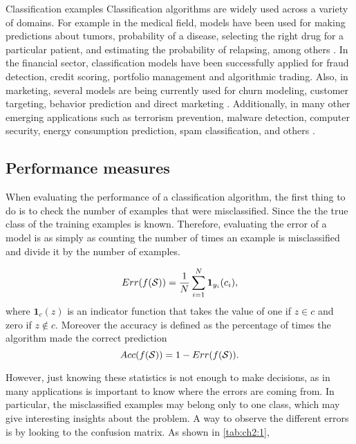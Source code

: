 \begin{remark}{Classification examples}
Classification algorithms are widely used across a variety of domains. For example in the 
medical field, models have been used for making predictions about tumors, probability 
of a disease, selecting the right drug for a particular patient, and estimating the probability of 
relapsing, among others \citep{Herland2014}. In the financial sector, classification models have 
been successfully applied for fraud detection, credit scoring, portfolio management and algorithmic 
trading. Also, in marketing, several models are being currently used for churn modeling, customer 
targeting, behavior prediction and direct marketing \citep{Baesens2014}. Additionally, in many 
other emerging applications such as terrorism prevention, malware detection, computer security, 
energy consumption prediction, spam classification, and others \citep{Kriegel2007}.
\end{remark}

\subsection{Performance measures}

When evaluating the performance of a classification algorithm, the first thing to do is to check 
the number of examples that were misclassified. Since the the true class of the training examples 
is known. Therefore, evaluating the error of a model is as simply as counting the number of times 
an example is misclassified and divide it by the number of examples.

\begin{equation}\label{eqn:ch2:error}
Err(f({\cal S})) = \frac{1}{N}  \sum_{i=1}^N {\bf 1} _{y_i}(c_i),
\end{equation}
where $\mathbf{1}_c(z)$ is an indicator function that takes the value of one if $z \in c$ and 
zero if $z \notin c$. Moreover the accuracy is defined as the percentage of times the algorithm 
made the correct prediction
\begin{equation}\label{eqn:ch2:accuracy}
Acc(f({\cal S})) = 1- Err(f({\cal S})).
\end{equation}

However, just knowing these statistics is not enough to make decisions, as in many applications is 
important to know where the errors are coming from. In particular, the misclassified examples may 
belong only to one class, which may give interesting insights about the problem.
A way to observe the different errors is by looking to the confusion matrix.
As shown in \tablename{ \ref{tab:ch2:1}}, 

